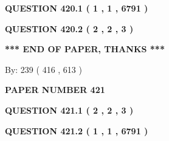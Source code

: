 \documentclass[12pt]{article}
\begin{document}
 
 
 
   
   
  
\vspace{0.2in}
  
{\textbf{\Large{QUESTION
420.1 
 ( 1 , 1 , 6791 )
}}}
  
  
  
\vspace{0.2in}
  
{\textbf{\Large{QUESTION
420.2 
 ( 2 , 2 , 3 )
}}}
  
  
   
   
 \vspace{0.2in}
 
   
   
   
   
\vspace{1.0in} 
{\textbf{\large{ *** END OF PAPER, THANKS *** }}} 
   
   
\hspace{1.0in} By: 
 239 ( 416 ,  613 )
   
   
   
   
\newpage 
\setcounter{page}{ 
   421001 } 
   
   
   
   
 {\textbf{ \Large{ PAPER NUMBER  421  }}}
   
   
\vspace{0.2in}
   
   
   
   
   
   
 \vspace{0.2in}
 
 
 
 
   
   
  
\vspace{0.2in}
  
{\textbf{\Large{QUESTION
421.1 
 ( 2 , 2 , 3 )
}}}
  
  
  
\vspace{0.2in}
  
{\textbf{\Large{QUESTION
421.2 
 ( 1 , 1 , 6791 )
}}}
  
  
   
   
 \vspace{0.2in}
 
   
   
   
   
\end{document}
